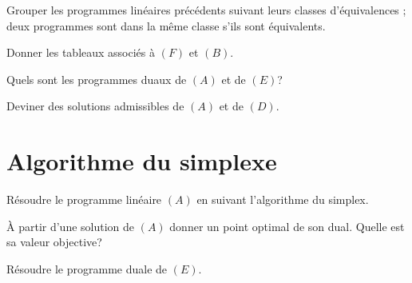 \documentclass[11pt,a4paper]{article}
\begin{document}
\begin{question}{3}
  Grouper les programmes linéaires précédents suivant leurs classes
  d'équivalences ; deux programmes sont dans la même classe s'ils sont
  équivalents.
\end{question}

\begin{question}{2}
  Donner les tableaux associés à $(F)$ et $(B)$.
\end{question}

\begin{question}{2}
  Quels sont les programmes duaux de $(A)$ et de $(E)$?
\end{question}

\begin{question}{2}
  Deviner des solutions admissibles de $(A)$ et de $(D)$.
\end{question}

\section{Algorithme du simplexe}

\begin{question}{4}
  Résoudre le programme linéaire $(A)$ en suivant l'algorithme du
  simplex.
\end{question}

\begin{question}{2}
  À partir d'une solution de $(A)$ donner un point optimal de son
  dual. Quelle est sa valeur objective?
\end{question}

\begin{question}{5}
  Résoudre le programme duale de $(E)$.
\end{question}
\end{document}
